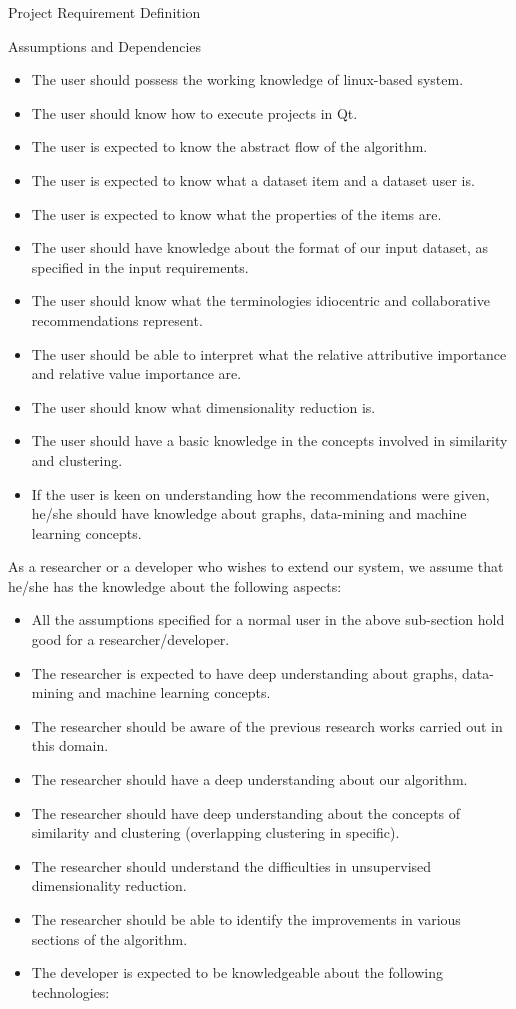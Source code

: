 \documentclass{report}
\begin{document}
\begin{projChapter}{Project Requirement Definition}
\begin{projSection}{Assumptions and Dependencies}
\begin{itemize}
  \item The user should possess the working knowledge of linux-based system.
  \item The user should know how to execute projects in Qt.
  \item The user is expected to know the abstract flow of the algorithm.
  \item The user is expected to know what a dataset item and a dataset user is.
  \item The user is expected to know what the properties of the items are.
  \item The user should have knowledge about the format of our input dataset, as specified in the input requirements.
  \item The user should know what the terminologies idiocentric and collaborative recommendations represent.
  \item The user should be able to interpret what the relative attributive importance and relative value importance are.
  \item The user should know what dimensionality reduction is.
  \item The user should have a basic knowledge in the concepts involved in similarity and clustering.
  \item If the user is keen on understanding how the recommendations were given, he/she should have knowledge about graphs, data-mining and machine learning concepts.
\end{itemize}


            As a researcher or a developer who wishes to extend our system, we assume that he/she has the knowledge about the following aspects:
            
\begin{itemize}
  \item All the assumptions specified for a normal user in the above sub-section hold good for a researcher/developer.
  \item The researcher is expected to have deep understanding about graphs, data-mining and machine learning concepts.
  \item The researcher should be aware of the previous research works carried out in this domain.
  \item The researcher should have a deep understanding about our algorithm.
  \item The researcher should have deep understanding about the concepts of similarity and clustering (overlapping clustering in specific).
  \item The researcher should understand the difficulties in unsupervised dimensionality reduction.
  \item The researcher should be able to identify the improvements in various sections of the algorithm.
  \item The developer is expected to be knowledgeable about the following technologies:
                    

\end{itemize}
\end{projSection}
\end{projChapter}
\end{document}
